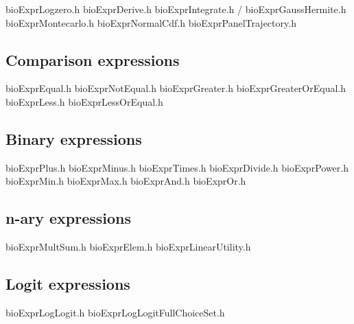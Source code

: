\documentclass[12pt,a4paper]{article}
\begin{document}
\begin{description}
\begin{itemize}
  \end{itemize}
 
\end{description}
  



bioExprLogzero.h
bioExprDerive.h
bioExprIntegrate.h / bioExprGaussHermite.h
bioExprMontecarlo.h
bioExprNormalCdf.h
bioExprPanelTrajectory.h
\subsection{Comparison expressions}
bioExprEqual.h
bioExprNotEqual.h
bioExprGreater.h
bioExprGreaterOrEqual.h
bioExprLess.h
bioExprLessOrEqual.h
\subsection{Binary expressions}
bioExprPlus.h
bioExprMinus.h
bioExprTimes.h
bioExprDivide.h
bioExprPower.h
bioExprMin.h
bioExprMax.h
bioExprAnd.h
bioExprOr.h
\subsection{n-ary expressions}
bioExprMultSum.h
bioExprElem.h
bioExprLinearUtility.h
\subsection{Logit expressions}
bioExprLogLogit.h
bioExprLogLogitFullChoiceSet.h











\end{document}
